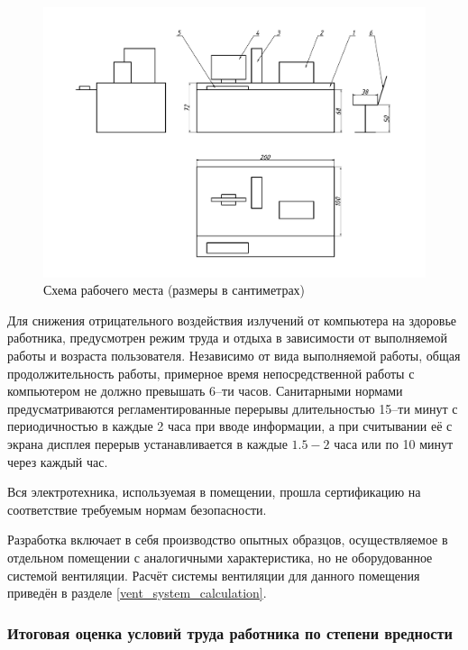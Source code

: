 \begin{figure}[ht!]
    \centering
    \includegraphics[width=\textwidth, keepaspectratio, clip=true, trim=0mm 10mm 0mm 15mm]
                    {./src/ecology/pictures/workplace_scheme}
    \caption{Схема рабочего места (размеры в сантиметрах)}
    \label{pic_workplace_scheme}
\end{figure}

Для снижения отрицательного воздействия излучений от компьютера
на здоровье работника, предусмотрен режим труда и отдыха в зависимости от выполняемой
работы и возраста пользователя. Независимо от вида выполняемой работы, общая
продолжительность работы, примерное время непосредственной работы с компьютером
не должно превышать 6--ти часов. Санитарными нормами предусматриваются регламентированные
перерывы длительностью 15--ти минут с периодичностью в каждые 2 часа при вводе
информации, а при считывании её с экрана дисплея перерыв устанавливается в
каждые $1.5 - 2$ часа или по 10 минут через каждый час.

Вся электротехника, используемая в помещении, прошла сертификацию на соответствие
требуемым нормам безопасности.

Разработка включает в себя производство опытных образцов, осуществляемое в отдельном
помещении с аналогичными характеристика, но не оборудованное системой вентиляции.
Расчёт системы вентиляции для данного помещения приведён в разделе \ref{vent_system_calculation}.



\subsubsection{Итоговая оценка условий труда работника по степени вредности}

